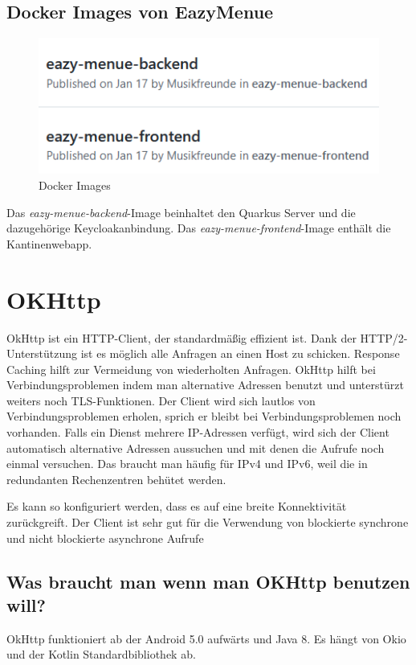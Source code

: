 \subsection{Docker Images von EazyMenue}
\begin{figure}[htp]
    \author{Bozidar Spasenovic}
    \centering
    \includegraphics[scale=0.80]{pics/docker-images.PNG}
    \caption{Docker Images}
    \label{fig:impl:docker-images}
\end{figure}   

Das \textit{eazy-menue-backend}-Image beinhaltet den Quarkus Server und die dazugehörige Keycloakanbindung.
Das \textit{eazy-menue-frontend}-Image enthält die Kantinenwebapp.

\section{OKHttp}
\cite{OkHttp}
\author{Bozidar Spasenovic}
OkHttp ist ein HTTP-Client, der standardmäßig effizient ist.
Dank der HTTP/2-Unterstützung ist es möglich alle Anfragen an einen Host zu schicken. 
Response Caching hilft zur Vermeidung von wiederholten Anfragen.
\linebreak  
OkHttp hilft bei Verbindungsproblemen indem man alternative Adressen benutzt und unterstürzt weiters noch TLS-Funktionen.
Der Client wird sich lautlos von Verbindungsproblemen erholen, sprich er bleibt bei Verbindungsproblemen noch vorhanden.
\linebreak
Falls ein Dienst mehrere IP-Adressen verfügt, wird sich der Client automatisch alternative Adressen aussuchen und mit denen
die Aufrufe noch einmal versuchen.
Das braucht man häufig für IPv4 und IPv6, weil die in redundanten Rechenzentren behütet werden. 


Es kann so konfiguriert werden, dass es auf eine breite Konnektivität zurückgreift.
Der Client ist sehr gut für die Verwendung von blockierte synchrone und nicht blockierte asynchrone Aufrufe 

\subsection{Was braucht man wenn man OKHttp benutzen will?}
OkHttp funktioniert ab der Android 5.0 aufwärts und Java 8. 
Es hängt von Okio und der Kotlin Standardbibliothek ab.   

